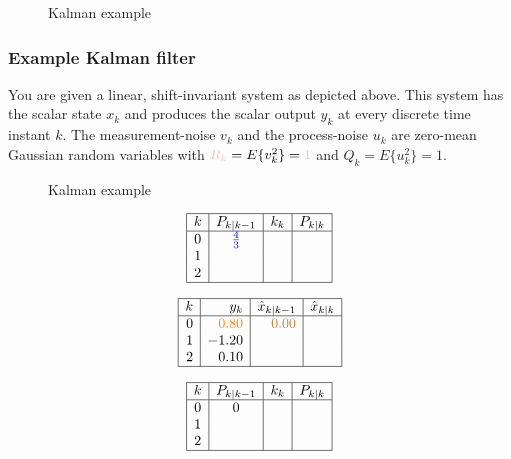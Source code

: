 \begin{figure}[ht]
 \centering
 \caption{Kalman example}
 \label{fig:kalman_1}
\end{figure}

\subsubsection{Example Kalman filter}
You are given a linear, shift-invariant system as depicted above. This system has the scalar state $x_k$ and produces
the scalar output $y_k$ at every discrete time instant $k$. The measurement-noise $v_k$ and the process-noise $u_k$ are zero-mean Gaussian random variables with $\textcolor{pink}{R_k} = E\{v_k^2\}=\textcolor{pink}{1}$ and $Q_k = E\{u_k^2\}= 1$.
\begin{figure}[ht]
 \centering
 \caption{Kalman example}
 \label{fig:kalman_example}
\end{figure}


$$
\begin{array}{|c|c|c|c|}
\hline k & P_{k \mid k-1} & k_k & P_{k \mid k} \\
\hline 0 & \textcolor{blue}{\frac{4}{3}} & & \\
1 & & & \\
2 & & & \\
\hline
\end{array}
$$

$$
\begin{array}{|r|r|r|r|}
\hline k & y_k & \hat{x}_{k \mid k-1} & \hat{x}_{k \mid k} \\
\hline 0 & \textcolor{orange}{0.80} & \textcolor{brown}{0.00} & \\
1 & -1.20 & & \\
2 & 0.10 & & \\
\hline
\end{array}
$$

$$
\begin{array}{|c|c|c|c|}
\hline k & P_{k \mid k-1} & k_k & P_{k \mid k} \\
\hline 0 & 0 & & \\
1 & & & \\
2 & & & \\
\hline
\end{array}
$$

